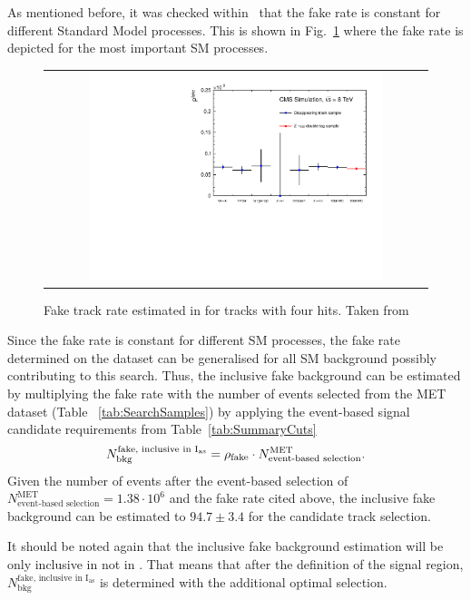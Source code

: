 As mentioned before, it was checked within~\cite{bib:CMS:DT_Thesis,bib:CMS:DT_8TeV_AN} that the fake rate is constant for different Standard Model processes.
This is shown in Fig.~\ref{fig:FakeRate} where the fake rate is depicted for the most important SM processes.
\begin{figure}[!t]
  \centering 
  \begin{tabular}{c}
    \includegraphics[width=0.79\textwidth]{figures/analysis/Background/fakeTrkRates.pdf}
  \end{tabular}
  \caption{Fake track rate estimated in \cite{bib:CMS:DT_Thesis,bib:CMS:DT_8TeV_AN} for tracks with four hits. Taken from \cite{bib:CMS:DT_8TeV_AN} }
  \label{fig:FakeRate}
\end{figure}
Since the fake rate is constant for different SM processes, the fake rate determined on the \Zlep dataset can be generalised for all SM background possibly contributing to this search.
Thus, the inclusive fake background can be estimated by multiplying the fake rate with the number of events selected from the MET dataset (Table ~\ref{tab:SearchSamples}) by applying the event-based signal candidate requirements from Table~\ref{tab:SummaryCuts}
\begin{equation*}
N^{\text{fake, inclusive in I$_{\text{as}}$}}_{\text{bkg}} = \rho_{\text{fake}} \cdot N_{\text{event-based selection}}^{\text{MET}}.
\end{equation*}
Given the number of events after the event-based selection of $N_{\text{event-based selection}}^{\text{MET}} = 1.38\cdot10^6$ and the fake rate cited above, 
the inclusive fake background can be estimated to $94.7\pm3.4$ for the candidate track selection.

It should be noted again that the inclusive fake background estimation will be only inclusive in \ias not in \pt.
That means that after the definition of the signal region, $N^{\text{fake, inclusive in I$_{\text{as}}$}}_{\text{bkg}}$ is determined with the additional optimal \pt selection.

